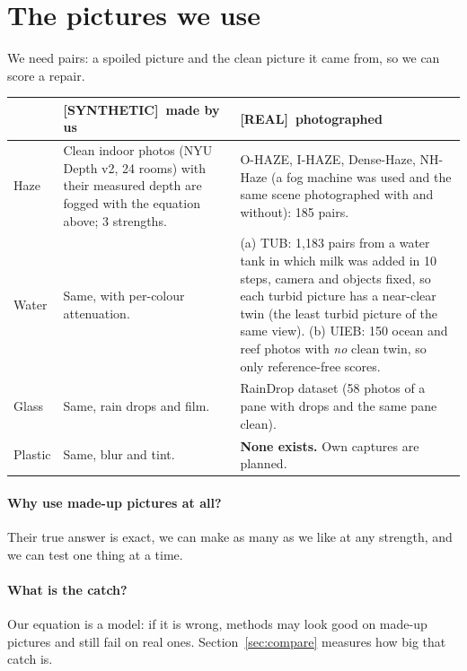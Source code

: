\documentclass[10pt,a4paper]{article}
\newcommand{\SYN}{\textcolor{orange!85!black}{\textbf{[SYNTHETIC]}}}
\newcommand{\REAL}{\textcolor{teal!80!black}{\textbf{[REAL]}}}
\begin{document}
\section{The pictures we use}\label{sec:data}
We need pairs: a spoiled picture and the clean picture it came from, so we can score a repair.

\begin{center}\small\begin{tabular}{p{2.6cm}p{6.7cm}p{6.3cm}}\toprule
 & \SYN\ made by us & \REAL\ photographed\\\midrule
Haze & Clean indoor photos (NYU Depth v2, 24 rooms) with their measured depth are fogged with the equation above; 3 strengths. & O-HAZE, I-HAZE, Dense-Haze, NH-Haze (a fog machine was used and the same scene photographed with and without): 185 pairs.\\
Water & Same, with per-colour attenuation. & (a) TUB: 1,183 pairs from a water tank in which milk was added in 10 steps, camera and objects fixed, so each turbid picture has a near-clear twin (the least turbid picture of the same view). (b) UIEB: 150 ocean and reef photos with \emph{no} clean twin, so only reference-free scores.\\
Glass & Same, rain drops and film. & RainDrop dataset (58 photos of a pane with drops and the same pane clean).\\
Plastic & Same, blur and tint. & \textbf{None exists.} Own captures are planned.\\\bottomrule
\end{tabular}\end{center}

\paragraph{Why use made-up pictures at all?} Their true answer is exact, we can make as many as we like at any strength, and we can test one thing at a time. \paragraph{What is the catch?} Our equation is a model: if it is wrong, methods may look good on made-up pictures and still fail on real ones. Section~\ref{sec:compare} measures how big that catch is.
\end{document}
